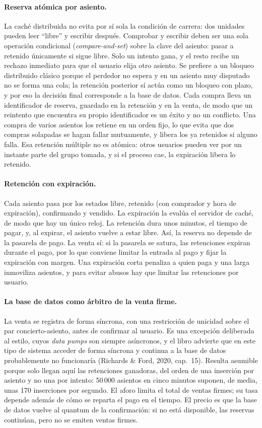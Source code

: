 \paragraph{Reserva atómica por asiento.}
La caché distribuida no evita por sí sola la condición de carrera: dos unidades pueden
leer ``libre'' y escribir después. Comprobar y escribir deben ser una sola operación
condicional (\emph{compare-and-set}) sobre la clave del asiento: pasar a retenido
únicamente si sigue libre. Solo un intento gana, y el resto recibe un rechazo inmediato
para que el usuario elija otro asiento. Se prefiere a un bloqueo distribuido clásico
porque el perdedor no espera y en un asiento muy disputado no se forma una cola; la
retención posterior sí actúa como un bloqueo con plazo, y por eso la decisión final
corresponde a la base de datos. Cada compra lleva un identificador de reserva, guardado
en la retención y en la venta, de modo que un reintento que encuentra su propio
identificador es un éxito y no un conflicto. Una compra de varios asientos los retiene
en un orden fijo, lo que evita que dos compras solapadas se hagan fallar mutuamente, y
libera los ya retenidos si alguno falla. Esa retención múltiple no es atómica: otros
usuarios pueden ver por un instante parte del grupo tomada, y si el proceso cae, la
expiración libera lo retenido.

\paragraph{Retención con expiración.}
Cada asiento pasa por los estados libre, retenido (con comprador y hora de expiración),
confirmando y vendido. La expiración la evalúa el servidor de caché, de modo que hay un
único reloj. La retención dura unos minutos, el tiempo de pagar, y, al expirar, el
asiento vuelve a estar libre. Así, la reserva no depende de la pasarela de pago. La
venta sí: si la pasarela se satura, las retenciones expiran durante el pago, por lo que
conviene limitar la entrada al pago y fijar la expiración con margen. Una expiración
corta penaliza a quien paga y una larga inmoviliza asientos, y para evitar abusos hay
que limitar las retenciones por usuario.

\paragraph{La base de datos como árbitro de la venta firme.}
La venta se registra de forma síncrona, con una restricción de unicidad sobre el par
concierto-asiento, antes de confirmar al usuario. Es una excepción deliberada al
estilo, cuyos \emph{data pumps} son siempre asíncronos, y el libro advierte que en este
tipo de sistema acceder de forma síncrona y continua a la base de datos probablemente
no funcionaría (Richards \& Ford, 2020, cap.~15). Resulta asumible porque solo llegan
aquí las retenciones ganadoras, del orden de una inserción por asiento y no una por
intento: 50\,000 asientos en cinco minutos suponen, de media, unas 170 inserciones por
segundo. El aforo limita el total de ventas firmes; su tasa depende además de cómo se
reparta el pago en el tiempo. El precio es que la base de datos vuelve al quantum de la
confirmación: si no está disponible, las reservas continúan, pero no se emiten ventas
firmes.

